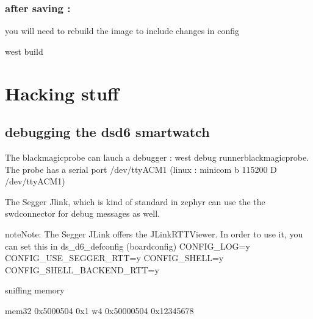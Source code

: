\documentclass[letterpaper,10pt,english]{sphinxmanual}
\begin{document}
\subsection{after saving :}
\label{\detokenize{menuconfig:after-saving}}
you will need to rebuild the image to include changes in config

\begin{sphinxVerbatim}[commandchars=\\\{\}]
 west build
\end{sphinxVerbatim}


\chapter{Hacking stuff}
\label{\detokenize{hacking/hacking:hacking-stuff}}\label{\detokenize{hacking/hacking:hacking}}\label{\detokenize{hacking/hacking::doc}}

\section{debugging   the ds\sphinxhyphen{}d6 smartwatch}
\label{\detokenize{hacking/debugging:debugging-the-ds-d6-smartwatch}}\label{\detokenize{hacking/debugging::doc}}
\begin{sphinxVerbatim}[commandchars=\\\{\}]
     
\end{sphinxVerbatim}

The blackmagicprobe can lauch a debugger : west debug \textendash{}runnerblackmagicprobe.
The probe has a serial port /dev/ttyACM1 (linux : minicom \sphinxhyphen{}b 115200 \sphinxhyphen{}D /dev/ttyACM1)

The Segger Jlink, which is kind of standard in zephyr can use the the swd\sphinxhyphen{}connector for debug messages as well.

\begin{sphinxadmonition}{note}{Note:}
The Segger JLink offers the JLinkRTTViewer.
In order to use it, you can set this in ds\_d6\_defconfig (boardconfig)
CONFIG\_LOG=y
CONFIG\_USE\_SEGGER\_RTT=y
CONFIG\_SHELL=y
CONFIG\_SHELL\_BACKEND\_RTT=y
\end{sphinxadmonition}

sniffing memory

\begin{sphinxVerbatim}[commandchars=\\\{\}]
mem32 0x5000504 0x1
w4 0x50000504 0x12345678
\end{sphinxVerbatim}
\end{document}
